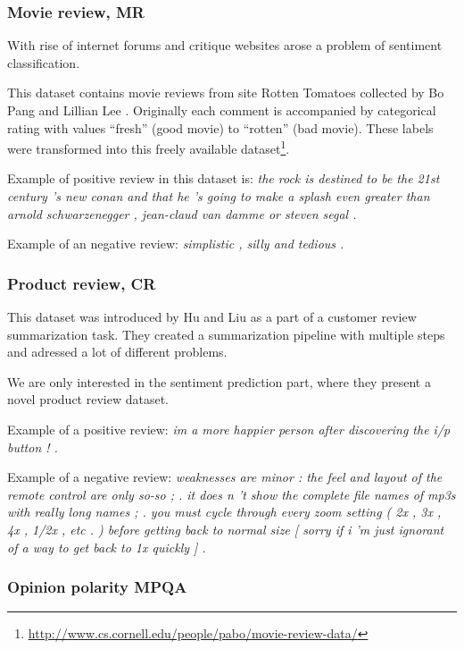     \subsubsection{Movie review, MR}
    
    With rise of internet forums and critique websites arose a problem of sentiment classification.
    
    This dataset contains movie reviews from site Rotten Tomatoes collected by Bo Pang and Lillian Lee \cite{pang2002thumbs}.
    Originally each comment is accompanied by categorical rating with values ``fresh'' (good movie) to ``rotten'' (bad movie). 
    These labels were transformed into this freely available dataset\footnote{\url{http://www.cs.cornell.edu/people/pabo/movie-review-data/}}.
    
    Example of positive review in this dataset is: \emph{the rock is destined to be the 21st century 's new conan and that he 's going to make a splash even greater than arnold schwarzenegger , jean-claud van damme or steven segal .}

    Example of an negative review: \emph{simplistic , silly and tedious .}
    
    \subsubsection{Product review, CR}
    
    This dataset was introduced by Hu and Liu \cite{hu2004mining} as a part of a customer review summarization task. 
    They created a summarization pipeline with multiple steps and adressed a lot of different problems. 
    
    We are only interested in the sentiment prediction part, where they present a novel product review dataset.
    
    Example of a positive review:
    \emph{im a more happier person after discovering the i/p button ! .}

    Example of a negative review:
    \emph{weaknesses are minor : the feel and layout of the remote control are only so-so ; . it does n 't show the complete file names of mp3s with really long names ; . you must cycle through every zoom setting ( 2x , 3x , 4x , 1/2x , etc . ) before getting back to normal size [ sorry if i 'm just ignorant of a way to get back to 1x quickly ] .}

    \subsubsection{Opinion polarity MPQA}

